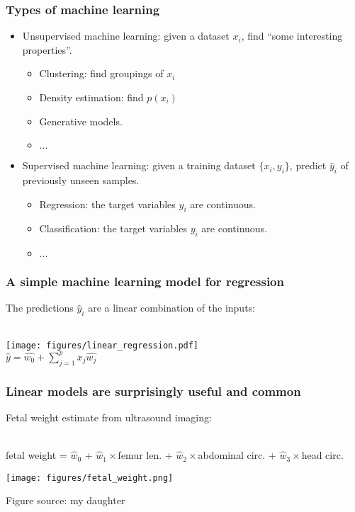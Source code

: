 \documentclass[notes]{beamer}          %
\begin{document}
\begin{frame}
\frametitle{Types of machine learning}

\begin{itemize}
	\item Unsupervised machine learning: given a dataset $x_i$, find ``some interesting properties''.
	\begin{itemize}
		\item Clustering: find groupings of $x_i$
		\item Density estimation: find $p(x_i)$
		\item Generative models. 
		\item $...$
	\end{itemize}
	\item Supervised machine learning: given a training dataset $\{x_i, y_i\}$, predict $\hat{y}_i$ of previously unseen samples.
	\begin{itemize}
		\item Regression:  the target variables $y_i$ are continuous. 
		\item Classification:  the target variables $y_i$ are continuous. 
		\item $...$
	\end{itemize}
\end{itemize}

\end{frame}


\begin{frame}
\frametitle{A simple machine learning model for regression}

The predictions $\hat{y}_i$ are a linear combination of the inputs: \\~\

\begin{center}
\texttt{[image: figures/linear\_regression.pdf]} \\
$\hat{y} = \hat{w_0} + \sum_{j=1}^{p} x_j \hat{w_j}$
\end{center}

\end{frame}


\begin{frame}
\frametitle{Linear models are surprisingly useful and common}

Fetal weight estimate from ultrasound imaging: \\~\

fetal weight  =  $\hat{w}_0$ + $\hat{w}_1 \times$femur len. + $\hat{w}_2 \times$abdominal circ. + $\hat{w}_3 \times$head circ.

\begin{center}
\texttt{[image: figures/fetal\_weight.png]}
\end{center}
\vfill
{\tiny Figure source: my daughter }
\end{frame}
\end{document}
